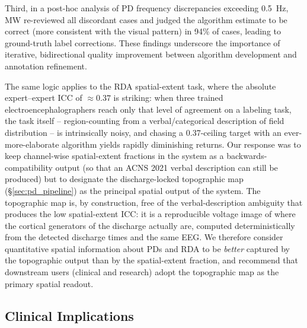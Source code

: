 \documentclass{iopjournal}
\begin{document}
Third, in a post-hoc analysis of PD frequency discrepancies exceeding 0.5~Hz, MW re-reviewed all discordant cases and judged the algorithm estimate to be correct (more consistent with the visual pattern) in 94\% of cases, leading to ground-truth label corrections. These findings underscore the importance of iterative, bidirectional quality improvement between algorithm development and annotation refinement.

The same logic applies to the RDA spatial-extent task, where the absolute expert--expert ICC of $\approx 0.37$ is striking: when three trained electroencephalographers reach only that level of agreement on a labeling task, the task itself -- region-counting from a verbal/categorical description of field distribution -- is intrinsically noisy, and chasing a 0.37-ceiling target with an ever-more-elaborate algorithm yields rapidly diminishing returns. Our response was to keep channel-wise spatial-extent fractions in the system as a backwards-compatibility output (so that an ACNS 2021 verbal description can still be produced) but to designate the discharge-locked topographic map (\S\ref{sec:pd_pipeline}) as the principal spatial output of the system. The topographic map is, by construction, free of the verbal-description ambiguity that produces the low spatial-extent ICC: it is a reproducible voltage image of where the cortical generators of the discharge actually are, computed deterministically from the detected discharge times and the same EEG. We therefore consider quantitative spatial information about PDs and RDA to be \emph{better} captured by the topographic output than by the spatial-extent fraction, and recommend that downstream users (clinical and research) adopt the topographic map as the primary spatial readout.

\subsection{Clinical Implications}
\label{sec:clinical}
\end{document}
